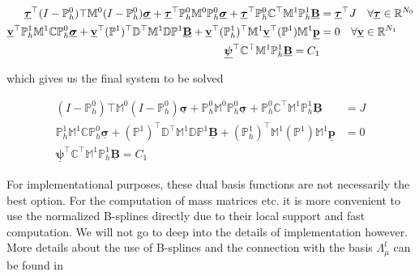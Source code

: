 \documentclass[../master_thesis.tex]{subfiles}
\begin{document}
\begin{align*}
    \underline{\bm{\tau}}^\top (I-\mathbb{P}^0_h)\top \mathbb{M}^0 
        (I-\mathbb{P}^0_h)\underline{\bm{\sigma}} 
        + \underline{\bm{\tau}}^\top \mathbb{P}^0_h \mathbb{M}^0 \mathbb{P}^0_h \underline{\bm{\sigma }}
        + \underline{\bm{\tau}}^\top \mathbb{P}^0_h \mathbb{C} ^\top \mathbb{M}^1 \mathbb{P}^1_h 
        \underline{\mathbf{B}} &= \underline{\bm{\tau}}^\top J \quad \forall \underline{\bm{\tau}} \in \mathbb{R}^{N_0}
    \\ \underline{\mathbf{v}}^\top \mathbb{P}^1_h \mathbb{M}^1 \mathbb{C} \mathbb{P}^0_h \underline{\bm{\sigma }}
        + \underline{\mathbf{v}}^\top (\mathbb{P}^1)^\top \mathbb{D}^\top \mathbb{M}^1 
        \mathbb{D} \mathbb{P}^1 \underline{\mathbf{B}} + \underline{\mathbf{v}}^\top (\mathbb{P}^1_h)^\top \mathbb{M}^1
        \underline{\mathbf{v}}^\top (\mathbb{P}^1) \mathbb{M}^1 \underline{\mathbf{p}} &= 0 
        \quad \forall \underline{\mathbf{v}} \in \mathbb{R}^{N_1}
    \\ \underline{\bm{\psi}}^\top \mathbb{C}^\top \mathbb{M}^1 \mathbb{P}^1_h \underline{\mathbf{B}} = C_1
\end{align*}

which gives us the final system to be solved 

\begin{align*}
    (I-\mathbb{P}^0_h)\top \mathbb{M}^0 
        (I-\mathbb{P}^0_h)\underline{\bm{\sigma}} 
        +  \mathbb{P}^0_h \mathbb{M}^0 \mathbb{P}^0_h \underline{\bm{\sigma }}
        +  \mathbb{P}^0_h \mathbb{C} ^\top \mathbb{M}^1 \mathbb{P}^1_h 
        \underline{\mathbf{B}} &=  J 
    \\ \mathbb{P}^1_h \mathbb{M}^1 \mathbb{C} \mathbb{P}^0_h \underline{\bm{\sigma }}
        + (\mathbb{P}^1)^\top \mathbb{D}^\top \mathbb{M}^1 
        \mathbb{D} \mathbb{P}^1 \underline{\mathbf{B}} + (\mathbb{P}^1_h)^\top \mathbb{M}^1
        (\mathbb{P}^1) \mathbb{M}^1 \underline{\mathbf{p}} &= 0 
    \\ \underline{\bm{\psi}}^\top \mathbb{C}^\top \mathbb{M}^1 \mathbb{P}^1_h \underline{\mathbf{B}} = C_1
\end{align*}

\begin{remark}
    For implementational purposes, these dual basis functions are not necessarily the 
    best option. For the computation of mass matrices etc. 
    it is more convenient to use the normalized B-splines directly due to their 
    local support and fast computation.
    We will not 
    go to deep into the details of implementation however. More details about the 
    use of B-splines and the connection with the basis $\Lambda^l_\mu$ can be found 
    in \cite[Sec.\,4.8]{multipatch_paper} 
\end{remark}
\end{document}
